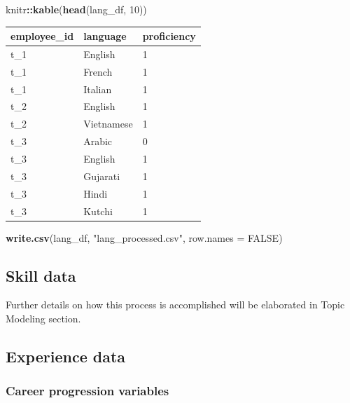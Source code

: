 \documentclass[11pt,]{article}
\newenvironment{Shaded}{\begin{snugshade}}{\end{snugshade}}
\newcommand{\AttributeTok}[1]{\textcolor[rgb]{0.13,0.29,0.53}{#1}}
\newcommand{\ConstantTok}[1]{\textcolor[rgb]{0.56,0.35,0.01}{#1}}
\newcommand{\DecValTok}[1]{\textcolor[rgb]{0.00,0.00,0.81}{#1}}
\newcommand{\FunctionTok}[1]{\textcolor[rgb]{0.13,0.29,0.53}{\textbf{#1}}}
\newcommand{\NormalTok}[1]{#1}
\newcommand{\SpecialCharTok}[1]{\textcolor[rgb]{0.81,0.36,0.00}{\textbf{#1}}}
\newcommand{\StringTok}[1]{\textcolor[rgb]{0.31,0.60,0.02}{#1}}
\begin{document}
\begin{Shaded}
\begin{Highlighting}[]
\NormalTok{knitr}\SpecialCharTok{::}\FunctionTok{kable}\NormalTok{(}\FunctionTok{head}\NormalTok{(lang\_df, }\DecValTok{10}\NormalTok{))}
\end{Highlighting}
\end{Shaded}

\begin{tabular}{l|l|l}
\hline
employee\_id & language & proficiency\\
\hline
t\_1 & English & 1\\
\hline
t\_1 & French & 1\\
\hline
t\_1 & Italian & 1\\
\hline
t\_2 & English & 1\\
\hline
t\_2 & Vietnamese & 1\\
\hline
t\_3 & Arabic & 0\\
\hline
t\_3 & English & 1\\
\hline
t\_3 & Gujarati & 1\\
\hline
t\_3 & Hindi & 1\\
\hline
t\_3 & Kutchi & 1\\
\hline
\end{tabular}

\begin{Shaded}
\begin{Highlighting}[]
\FunctionTok{write.csv}\NormalTok{(lang\_df, }\StringTok{"lang\_processed.csv"}\NormalTok{, }\AttributeTok{row.names =} \ConstantTok{FALSE}\NormalTok{)}
\end{Highlighting}
\end{Shaded}

\hypertarget{skill-data}{%
\subsection{Skill data}\label{skill-data}}

Further details on how this process is accomplished will be elaborated
in Topic Modeling section.

\hypertarget{experience-data}{%
\subsection{Experience data}\label{experience-data}}

\hypertarget{career-progression-variables}{%
\subsubsection{Career progression
variables}\label{career-progression-variables}}
\end{document}
